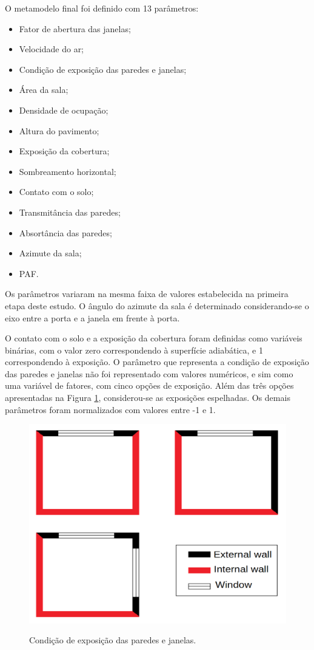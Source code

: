 \documentclass[brazil,hardcopy,openany,a4paper]{ufscthesis}
\begin{document}
	O metamodelo final foi definido com 13 parâmetros:
	\begin{itemize}
		\item Fator de abertura das janelas;
		\item Velocidade do ar;
		\item Condição de exposição das paredes e janelas;
		\item Área da sala;
		\item Densidade de ocupação;
		\item Altura do pavimento;
		\item Exposição da cobertura;
		\item Sombreamento horizontal;
		\item Contato com o solo;
		\item Transmitância das paredes;
		\item Absortância das paredes;
		\item Azimute da sala;
		\item PAF.
	\end{itemize}
	
	Os parâmetros variaram na mesma faixa de valores estabelecida na primeira etapa deste estudo. O ângulo do azimute da sala é determinado considerando-se o eixo entre a porta e a janela em frente à porta.
	
	O contato com o solo e a exposição da cobertura foram definidas como variáveis binárias, com o valor zero correspondendo à superfície adiabática, e 1 correspondendo à exposição.
	O parâmetro que representa a condição de exposição das paredes e janelas não foi representado com valores numéricos, e sim como uma variável de fatores, com cinco opções de exposição. Além das três opções apresentadas na Figura \ref{fig:exp_sz}, considerou-se as exposições espelhadas. 	
	Os demais parâmetros foram normalizados com valores entre -1 e 1.
	
	\begin{figure}[H]
		\centering
		\caption{Condição de exposição das paredes e janelas.}
		\includegraphics[width=1\linewidth]{img/wallexposition.png}
		\label{fig:exp_sz}
	\end{figure}
	
\end{document}
